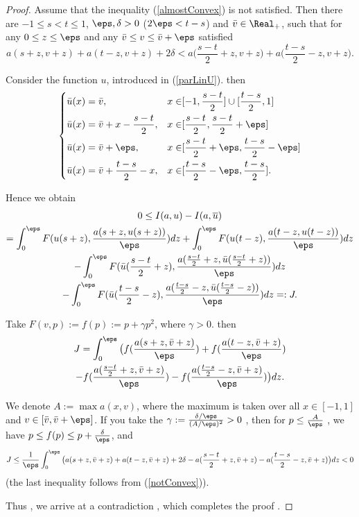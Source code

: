 \begin{proof}
Assume that the inequality (\ref{almostConvex}) is not satisfied.
Then there are $-1 \le s < t \le 1$, $\eps, \delta > 0$ ($2 \eps < t - s$) and $\bar{v} \in \Real_+$,
such that for any $0 \le z \le \eps$ and any $\bar{v} \le v \le \bar{v} + \eps$ satisfied
\begin{equation}
\label{notConvex}
a(s + z, v + z) + a(t - z, v + z) + 2 \delta < a\Big(\frac{s - t}{2} + z, v + z \Big) + a\Big(\frac{t - s}{2} - z, v + z \Big).
\end{equation}

Consider the function $u$, introduced in (\ref{parLinU}). then
$$
\left\{
\begin{aligned}
\bar{u}(x) &= \bar{v}, & x \in &[-1, \frac{s - t}{2}] \cup [\frac{t - s}{2}, 1]\\
\bar{u}(x) &= \bar{v} + x - \frac{s - t}{2}, & x \in &[\frac{s - t}{2}, \frac{s - t}{2} + \eps]\\
\bar{u}(x) &= \bar{v} + \eps, & x \in &[\frac{s - t}{2} + \eps, \frac{t - s}{2} - \eps]\\
\bar{u}(x) &= \bar{v} + \frac{t - s}{2} - x, & x \in &[\frac{t - s}{2} - \eps, \frac{t - s}{2}].
\end{aligned}
\right.
$$

Hence we obtain
\begin{multline*}
0 \le I(a, u) - I(a, \overline{u}) \\
=\int_0^{\eps} F( u(s + z), \frac{a( s + z, u(s + z) )}{\eps} ) dz + \int_0^{\eps} F( u(t - z), \frac{a(t - z, u(t - z))}{\eps} ) dz \\
-\int_0^{\eps} F( \bar{u}(\frac{s - t}{2} + z), \frac{a( \frac{s - t}{2} + z, \bar{u}(\frac{s - t}{2} + z) )}{\eps} ) dz \\
-\int_0^{\eps} F( \bar{u}(\frac{t - s}{2} - z), \frac{a( \frac{t - s}{2} - z, \bar{u}(\frac{t - s}{2} - z) )}{\eps} ) dz =: J.
\end{multline*}

Take $F(v, p) := f(p) := p + \gamma p^2$, where $\gamma > 0$.
then
\begin{multline*}
J = \int_0^{\eps} \big( f(\frac{a(s + z, \bar{v} + z)}{\eps}) + f(\frac{a(t - z, \bar{v} + z)}{\eps}) \\
- f(\frac{a(\frac{s - t}{2} + z, \bar{v} + z)}{\eps}) - f(\frac{a(\frac{t - s}{2} - z, \bar{v} + z)}{\eps}) \big) dz.
\end{multline*}

We denote $A := \max a(x, v)$, where the maximum is taken over all $x \in [-1, 1]$ and $v \in [\bar{v}, \bar{v} + \eps]$.
If you take the $\gamma := \frac{\delta / \eps}{(A / \eps)^2} > 0$ ,
then for $p \le \frac{A}{\eps}$ , we have $p \le f( p ) \le p + \frac{\delta}{\eps}$, and
\begin{equation*}
J \le \frac{1}{\eps} \int_0^{\eps} \big( a(s + z, \bar{v} + z) + a(t - z, \bar{v} + z) + 2 \delta
- a(\frac{s - t}{2} + z, \bar{v} + z) - a(\frac{t - s}{2} - z, \bar{v} + z) \big) dz < 0
\end{equation*}
(the last inequality follows from (\ref{notConvex})).

Thus , we arrive at a contradiction , which completes the proof .
\end{proof}

